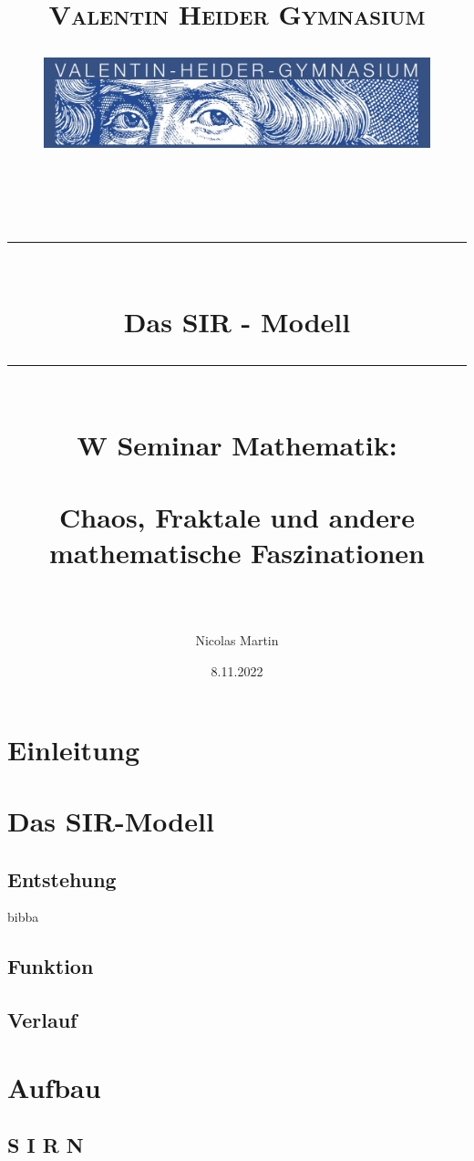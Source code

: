 \documentclass[12pt]{scrartcl} %
\title{	
	\normalfont\normalsize
	\vspace{200pt}
	\textsc{Valentin Heider Gymnasium}\\
	\begin{figure}[h] %
	\centering
	\includegraphics[width=0.5\columnwidth]{VHGLogo.jpg} 
	\end{figure}
	\vspace{25pt}\\
	
	\rule{\linewidth}{0.5pt}\\
	\vspace{20pt}
	{\huge Das SIR - Modell}\\
	\vspace{12pt}
	\rule{\linewidth}{2pt}\\
	\vspace{20pt}
	{\Large W Seminar Mathematik:}\\
	\vspace{12pt}\\
	{\Large Chaos, Fraktale und andere mathematische Faszinationen}\\
	\vspace{15pt}\\
}
\author{\LARGE Nicolas Martin} %
\date{\normalsize 8.11.2022} %
\begin{document}

\maketitle %
\newpage

\doublespacing
\tableofcontents
\onehalfspacing
\newpage


\section{Einleitung}



\section{Das SIR-Modell}

\subsection{Entstehung}

bibba \cite[spage 69]{1}


\subsection{Funktion}


\subsection{Verlauf}


\section{Aufbau}

\subsection{S I R N}
\end{document}
